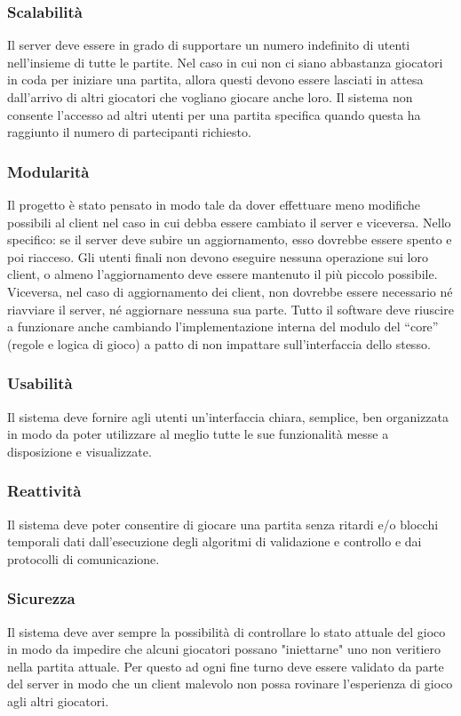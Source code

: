\subsubsection{Scalabilità}
Il server deve essere in grado di supportare un numero indefinito di utenti nell’insieme di tutte le partite.
Nel caso in cui non ci siano abbastanza giocatori in coda per iniziare una partita, allora questi devono essere lasciati in attesa dall’arrivo di altri giocatori che vogliano giocare anche loro.
Il sistema non consente l’accesso ad altri utenti per una partita specifica quando questa ha raggiunto il numero di partecipanti richiesto.

\subsubsection{Modularità}
Il progetto è stato pensato in modo tale da dover effettuare meno modifiche possibili al client nel caso in cui debba essere cambiato il server e viceversa.
Nello specifico: se il server deve subire un aggiornamento, esso dovrebbe essere spento e poi riacceso.
Gli utenti finali non devono eseguire nessuna operazione sui loro client, o almeno l’aggiornamento deve essere mantenuto il più piccolo possibile.
Viceversa, nel caso di aggiornamento dei client, non dovrebbe essere necessario né riavviare il server, né aggiornare nessuna sua parte.
Tutto il software deve riuscire a funzionare anche cambiando l’implementazione interna del modulo del “core” (regole e logica di gioco) a patto di non impattare sull’interfaccia dello stesso.

\subsubsection{Usabilità}
Il sistema deve fornire agli utenti un'interfaccia chiara, semplice, ben organizzata in modo da poter utilizzare al meglio tutte le sue funzionalità messe a disposizione e visualizzate.

\subsubsection{Reattività}
Il sistema deve poter consentire di giocare una partita senza ritardi e/o blocchi temporali dati dall’esecuzione degli algoritmi di validazione e controllo e dai protocolli di comunicazione.

\subsubsection{Sicurezza}
Il sistema deve aver sempre la possibilità di controllare lo stato attuale del gioco in modo da impedire che alcuni giocatori possano "iniettarne" uno non veritiero nella partita attuale.
Per questo ad ogni fine turno deve essere validato da parte del server in modo che un client malevolo non possa rovinare l’esperienza di gioco agli altri giocatori.

